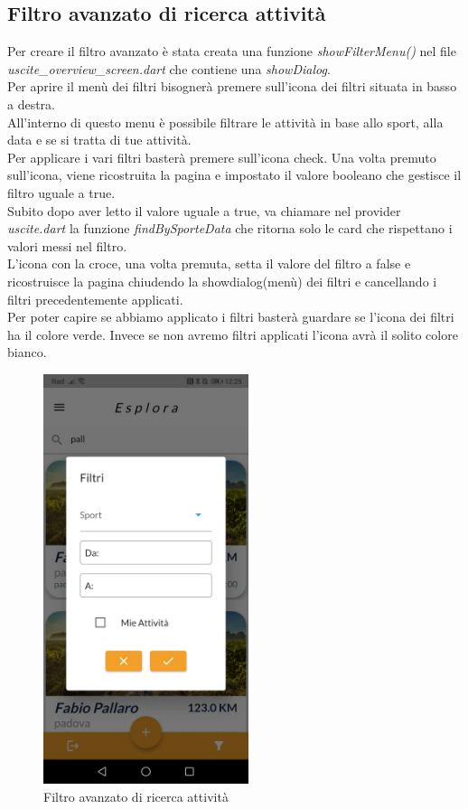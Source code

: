 \subsection{Filtro avanzato di ricerca attività}
Per creare il filtro avanzato è stata creata una funzione \textit{showFilterMenu()} nel file \textit{uscite\_overview\_screen.dart} che contiene una \textit{showDialog}.\\
Per aprire il menù dei filtri bisognerà premere sull'icona dei filtri situata in basso a destra.\\
All'interno di questo menu è possibile filtrare le attività in base allo sport, alla data e se si tratta di tue attività.\\
Per applicare i vari filtri basterà premere sull'icona check.
Una volta premuto sull'icona, viene ricostruita la pagina e impostato il valore booleano che gestisce il filtro uguale a true.\\
Subito dopo aver letto il valore uguale a true, va chiamare nel provider \textit{uscite.dart} la funzione \textit{findBySporteData} che ritorna solo le card che rispettano i valori messi nel filtro.\\
L'icona con la croce, una volta premuta, setta il valore del filtro a false e ricostruisce la pagina chiudendo la showdialog(menù) dei filtri e cancellando i filtri precedentemente applicati.\\
Per poter capire se abbiamo applicato i filtri basterà guardare se l'icona dei filtri ha il colore verde.
Invece se non avremo filtri applicati l'icona avrà il solito colore bianco.

\begin{figure}[htbp]	
	\centering
	\includegraphics[width=6cm]{immagini/filtroavanzato.jpeg}
	\caption{Filtro avanzato di ricerca attività}
	\label{fig:Filtro avanzato di ricerca attività}
\end{figure}

